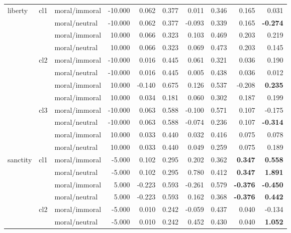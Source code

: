 \documentclass[runninghheads]{llncs}
\begin{document}
\begin{table}[!ht]
\begin{tabular}{|l|l|l|r|r|r|r|r|r|r|}
        \hline\hline
        \multirow{12}{*}{liberty} & \multirow{4}{*}{cl1} & moral/immoral & -10.000 & 0.062 & 0.377 & 0.011 & 0.346 & 0.165 & 0.031 \\ 
         &  & moral/neutral & -10.000 & 0.062 & 0.377 & -0.093 & 0.339 & 0.165 & \textbf{-0.274} \\ 
         &  & moral/immoral & 10.000 & 0.066 & 0.323 & 0.103 & 0.469 & 0.203 & 0.219 \\ 
         &  & moral/neutral & 10.000 & 0.066 & 0.323 & 0.069 & 0.473 & 0.203 & 0.145 \\ 
          \cline{2-10}
         & \multirow{4}{*}{cl2} & moral/immoral & -10.000 & 0.016 & 0.445 & 0.061 & 0.321 & 0.036 & 0.190 \\ 
         &  & moral/neutral & -10.000 & 0.016 & 0.445 & 0.005 & 0.438 & 0.036 & 0.012 \\ 
         &  & moral/immoral & 10.000 & -0.140 & 0.675 & 0.126 & 0.537 & -0.208 & \textbf{0.235} \\ 
         &  & moral/immoral & 10.000 & 0.034 & 0.181 & 0.060 & 0.302 & 0.187 & 0.199 \\ 
          \cline{2-10}
         & \multirow{4}{*}{cl3} & moral/immoral & -10.000 & 0.063 & 0.588 & -0.100 & 0.571 & 0.107 & -0.175 \\ 
         &  & moral/neutral & -10.000 & 0.063 & 0.588 & -0.074 & 0.236 & 0.107 & \textbf{-0.314} \\
         &  & moral/immoral & 10.000 & 0.033 & 0.440 & 0.032 & 0.416 & 0.075 & 0.078 \\ 
         &  & moral/neutral & 10.000 & 0.033 & 0.440 & 0.049 & 0.259 & 0.075 & 0.189 \\ 
        \hline\hline
        \multirow{12}{*}{sanctity} & \multirow{4}{*}{cl1} & moral/immoral & -5.000 & 0.102 & 0.295 & 0.202 & 0.362 & \textbf{0.347} & \textbf{0.558} \\ 
         &  & moral/neutral & -5.000 & 0.102 & 0.295 & 0.780 & 0.412 & \textbf{0.347} & \textbf{1.891} \\ 
         &  & moral/immoral & 5.000 & -0.223 & 0.593 & -0.261 & 0.579 & \textbf{-0.376} & \textbf{-0.450} \\ 
         &  & moral/neutral & 5.000 & -0.223 & 0.593 & 0.162 & 0.368 & \textbf{-0.376} & \textbf{0.442} \\ 
          \cline{2-10}
         & \multirow{4}{*}{cl2} & moral/immoral & -5.000 & 0.010 & 0.242 & -0.059 & 0.437 & 0.040 & -0.134 \\ 
         &  & moral/neutral & -5.000 & 0.010 & 0.242 & 0.452 & 0.430 & 0.040 & \textbf{1.052} \\ 

\end{tabular}
\end{table}
\end{document}
